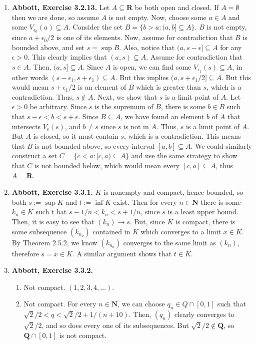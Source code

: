 \documentclass{article}
\newcommand{\N}{\mathbf{N}}
\newcommand{\Q}{\mathbf{Q}}
\newcommand{\R}{\mathbf{R}}
\newcommand{\set}[1]{\{#1\}}
\newcommand{\exc}[2][Abbott]{\item \textbf{#1, Exercise #2.}}
\newcommand{\lep}[1][L]{#1et $\epsilon > 0$ be arbitrary}
\begin{document}
\begin{enumerate}
    \exc{3.2.13}
    Let $A \subseteq \R$ be both open and closed. If $A = \emptyset$ then we are done, so assume $A$ is not empty. Now, choose some $a \in A$ and some $V_{\epsilon_0}(a) \subseteq A$. Consider the set $B = \set{b > a: (a, b] \subseteq A}$. $B$ is not empty, since $a + \epsilon_0/2$ is one of its elements. Now, assume for contradiction that $B$ is bounded above, and set $s = \sup{B}$. Also, notice that $(a, s-\epsilon] \subseteq A$ for any $\epsilon > 0$. This clearly implies that $(a, s) \subseteq A$. Assume for contradiction that $s \in A$. Then, $(a,s] \subseteq A$. Since $A$ is open, we can find some $V_{\epsilon_1}(s) \subseteq A$, in other words $(s-\epsilon_1, s+\epsilon_1) \subseteq A$. But this implies $(a,s+\epsilon_1/2] \subseteq A$. But this would mean $s+\epsilon_1/2$ is an element of $B$ which is greater than $s$, which is a contradiction. Thus, $s \notin A$. Next, we show that $s$ is a limit point of $A$. \lep. Since $s$ is the supremum of $B$, there is some $b \in B$ such that $s-\epsilon < b < s+\epsilon$. Since $B \subseteq A$, we have found an element $b$ of $A$ that intersects $V_\epsilon(s)$, and $b \neq s$ since $s$ is not in $A$. Thus, $s$ is a limit point of $A$. But $A$ is closed, so it must contain $s$, which is a contradiction. This means that $B$ is not bounded above, so every interval $[a, b] \subseteq A$. We could similarly construct a set 
    $C = \set{c < a : [c, a) \subseteq A}$ and use the same strategy to show that $C$ is not bounded below, which would mean every $[c, a] \subseteq A$, thus $A = \R$. 
    
    \exc{3.3.1}
    $K$ is nonempty and compact, hence bounded, so both $s := \sup K$ and $t := \inf K$ exist. Then for every $n \in \N$ there is some $k_n \in K$ such t hat $s - 1/n < k_n < s+1/n$, since $s$ is a least upper bound. Then, it is easy to see that $(k_n) \to s$. But, since $K$ is compact, there is some subsequence $(k_{n_a})$ contained in $K$ which converges to a limit $x \in K$. By Theorem 2.5.2, we know $(k_{n_a})$ converges to the same limit as $(k_n)$, therefore $s = x \in K$. A similar argument shows that $t \in K$.
    
    \exc{3.3.2}
    \begin{enumerate}
        \item Not compact. $(1, 2, 3, 4,\dots)$.
        
        \item Not compact. For every $n \in \N$, we can choose $q_n \in Q \cap [0, 1]$ such that $\sqrt{2}/2 < q < \sqrt{2}/2 + 1/(n+10)$. Then, $(q_n)$ clearly converges to $\sqrt{2}/2$, and so does every one of its subsequences. But $\sqrt{2}/2 \notin \Q$, so $\Q \cap [0, 1]$ is not compact.
        

\end{enumerate}
\end{enumerate}
\end{document}
